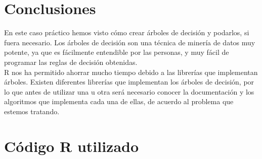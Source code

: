 \documentclass[12pt,a4paper,twoside,openright,titlepage,final]{article}
\begin{document}
\section{Conclusiones}

En este caso práctico hemos visto cómo crear árboles de decisión y podarlos, si fuera necesario. Los árboles de decisión son una técnica de minería de datos muy potente, ya que es fácilmente entendible por las personas, y muy fácil de programar las reglas de decisión obtenidas.\\

R nos ha permitido ahorrar mucho tiempo debido a las librerías que implementan árboles. Existen diferentes librerías que implementan los árboles de decisión, por lo que antes de utilizar una u otra será necesario conocer la documentación y los algoritmos que implementa cada una de ellas, de acuerdo al problema que estemos tratando. 

\clearpage

\section{Código R utilizado}


\end{document}
